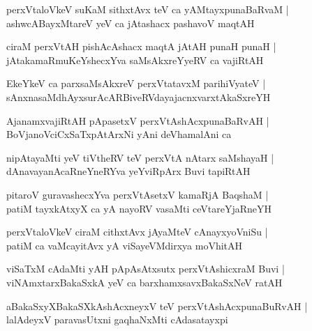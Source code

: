 \documentclass[twoside,12pt,openright]{book}
\newcounter{shloka}[chapter]
\begin{document}
\begin{shloka}%
perxVtaloVkeV suKaM sithxtAvx teV ca yAMtayxpunaBaRvaM |\\
ashwcABayxMtareV yeV ca jAtashacx pashavoV maqtAH 
\end{shloka}

\begin{shloka}%
ciraM perxVtAH pishAcAshacx maqtA jAtAH punaH punaH |\\
jAtakamaRmuKeYshecxYva saMsAkxreYyeRV ca vajiRtAH 
\end{shloka}

\begin{shloka}%
EkeYkeV ca parxsaMsAkxreV perxVtatavxM parihiVyateV |\\
sAnxnasaMdhAyxsurAcARBiveRVdayajacnxvarxtAkaSxreYH 
\end{shloka}

\begin{shloka}%
AjanamxvajiRtAH pApasetxV perxVtAshAcxpunaBaRvAH |\\
BoVjanoVciCxSaTxpAtArxNi yAni deVhamalAni ca 
\end{shloka}

\begin{shloka}%
nipAtayaMti yeV tiVtheRV teV perxVtA nAtarx saMshayaH |\\
dAnavayanAcaRneYneRYva yeYviRpArx Buvi tapiRtAH 
\end{shloka}

\begin{shloka}%
pitaroV guravashecxYva perxVtAsetxV kamaRjA BaqshaM |\\
patiM tayxkAtxyX ca yA nayoRV vasaMti ceVtareYjaRneYH
\end{shloka}

\begin{shloka}%
perxVtaloVkeV ciraM cithxtAvx jAyaMteV cAnayxyoVniSu |\\
patiM ca vaMcayitAvx yA viSayeVMdirxya moVhitAH 
\end{shloka}

\begin{shloka}%
viSaTxM cAdaMti yAH pApAsAtxsutx perxVtAshicxraM Buvi |\\
viNAmxtarxBakaSxkA yeV ca barxhamxsavxBakaSxNeV ratAH 
\end{shloka}

\begin{shloka}%
aBakaSxyXBakaSXkAshAcxneyxV teV perxVtAshAcxpunaBuRvAH |\\
lalAdeyxV paravasUtxni gaqhaNxMti cAdasatayxpi 
\end{shloka}
\end{document}

